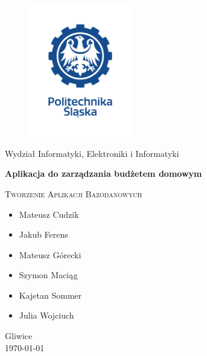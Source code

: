 \documentclass[12pt,a4paper,oneside]{article}
\begin{document}
{
\begin{titlepage}
    \fancyhf{}
    \headheight=0pt
    \headsep=0pt
    \begin{center}
        \frenchspacing
        \thispagestyle{empty}
        \makeatletter
        \setlength{}
        \begin{figure}
            \centering
            \includegraphics[width=0.4\textwidth,keepaspectratio]{politechnika_sl_logo_pion_pl_rgb.png}
        \end{figure}
        \makeatother
        {\large
            Wydział Informatyki, Elektroniki i Informatyki}

        \vfill
        \textbf{\Huge
            Aplikacja do zarządzania budżetem domowym}
        \vspace*{1\baselineskip}

        {\large \scshape
            Tworzenie Aplikacji Bazodanowych}
        \vfill

        {\small
            \begin{itemize}
                \item[] Mateusz Cudzik\\
                \item[] Jakub Ferens\\
                \item[] Mateusz Górecki\\
                \item[] Szymon Maciąg\\
                \item[] Kajetan Sommer\\
                \item[] Julia Wojciuch
            \end{itemize}
            \vspace*{1\baselineskip}

            Gliwice\\
            \today
        }
        \vspace*{0\baselineskip}
    \end{center}
\end{titlepage}
}
\end{document}
